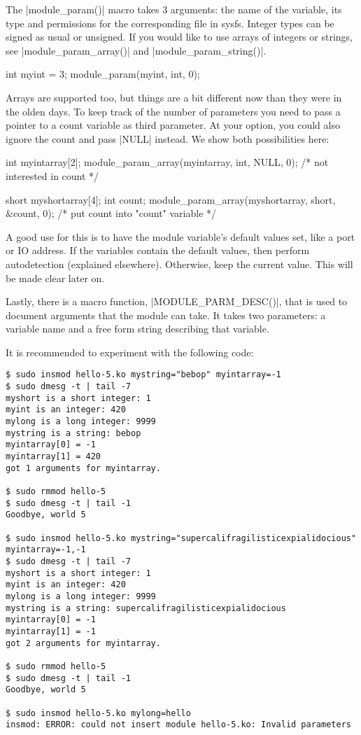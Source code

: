 \documentclass[10pt, oneside]{book}
\begin{document}
The \cpp|module_param()| macro takes 3 arguments: the name of the variable, its type and permissions for the corresponding file in sysfs.
Integer types can be signed as usual or unsigned. If you would like to use arrays of integers or strings, see \cpp|module_param_array()| and \cpp|module_param_string()|.

\begin{code}
int myint = 3;
module_param(myint, int, 0);
\end{code}

Arrays are supported too, but things are a bit different now than they were in the olden days.
To keep track of the number of parameters you need to pass a pointer to a count variable as third parameter.
At your option, you could also ignore the count and pass \cpp|NULL| instead. We show both possibilities here:

\begin{code}
int myintarray[2];
module_param_array(myintarray, int, NULL, 0); /* not interested in count */

short myshortarray[4];
int count;
module_param_array(myshortarray, short, &count, 0); /* put count into "count" variable */
\end{code}

A good use for this is to have the module variable's default values set, like a port or IO address.
If the variables contain the default values, then perform autodetection (explained elsewhere). Otherwise, keep the current value.
This will be made clear later on.

Lastly, there is a macro function, \cpp|MODULE_PARM_DESC()|, that is used to document arguments that the module can take.
It takes two parameters: a variable name and a free form string describing that variable.


It is recommended to experiment with the following code:
\begin{verbatim}
$ sudo insmod hello-5.ko mystring="bebop" myintarray=-1
$ sudo dmesg -t | tail -7
myshort is a short integer: 1
myint is an integer: 420
mylong is a long integer: 9999
mystring is a string: bebop
myintarray[0] = -1
myintarray[1] = 420
got 1 arguments for myintarray.

$ sudo rmmod hello-5
$ sudo dmesg -t | tail -1
Goodbye, world 5

$ sudo insmod hello-5.ko mystring="supercalifragilisticexpialidocious" myintarray=-1,-1
$ sudo dmesg -t | tail -7
myshort is a short integer: 1
myint is an integer: 420
mylong is a long integer: 9999
mystring is a string: supercalifragilisticexpialidocious
myintarray[0] = -1
myintarray[1] = -1
got 2 arguments for myintarray.

$ sudo rmmod hello-5
$ sudo dmesg -t | tail -1
Goodbye, world 5

$ sudo insmod hello-5.ko mylong=hello
insmod: ERROR: could not insert module hello-5.ko: Invalid parameters
\end{verbatim}
\end{document}
